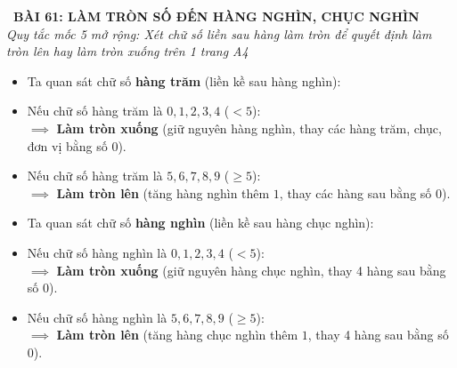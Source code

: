 \documentclass[11pt,a4paper]{article}
\begin{document}
\begin{tcolorbox}[
  enhanced,
  colback=white,
  colframe=primary,
  arc=3mm,
  boxrule=1.2pt,
  left=4mm, right=4mm, top=2.5mm, bottom=2.5mm,
  drop shadow=black!10!white
]
  \centering
  {\Large\bfseries\color{primary}\faBookmark\ BÀI 61: LÀM TRÒN SỐ ĐẾN HÀNG NGHÌN, CHỤC NGHÌN}\\[1.5mm]
  {\small\itshape\color{black!75}Quy tắc mốc 5 mở rộng: Xét chữ số liền sau hàng làm tròn để quyết định làm tròn lên hay làm tròn xuống trên 1 trang A4}
\end{tcolorbox}

\vspace{-2mm}


\noindent
\begin{minipage}[t]{0.49\textwidth}\vspace{0pt}
\begin{tcolorbox}[
  enhanced,
  colback=blue!4!white,
  colframe=blue!75!black,
  arc=2mm, boxrule=0.8pt,
  left=2mm, right=2mm, top=1.8mm, bottom=1.8mm,
  title={\footnotesize\bfseries\color{white}\faKey\ 1. Làm tròn đến hàng nghìn}
]
{\footnotesize
\begin{itemize}\setlength{\itemsep}{1.5pt}\setlength{\leftskip}{-2.5mm}
  \item Ta quan sát chữ số \textbf{hàng trăm} (liền kề sau hàng nghìn):
  \item Nếu chữ số hàng trăm là $0, 1, 2, 3, 4$ ($< 5$):\\
  $\implies$ \textbf{Làm tròn xuống} (giữ nguyên hàng nghìn, thay các hàng trăm, chục, đơn vị bằng số $0$).
  \item Nếu chữ số hàng trăm là $5, 6, 7, 8, 9$ ($\ge 5$):\\
  $\implies$ \textbf{Làm tròn lên} (tăng hàng nghìn thêm $1$, thay các hàng sau bằng số $0$).
\end{itemize}
}
\end{tcolorbox}
\end{minipage}
\hfill
\begin{minipage}[t]{0.49\textwidth}\vspace{0pt}
\begin{tcolorbox}[
  enhanced,
  colback=teal!4!white,
  colframe=teal!75!black,
  arc=2mm, boxrule=0.8pt,
  left=2mm, right=2mm, top=1.8mm, bottom=1.8mm,
  title={\footnotesize\bfseries\color{white}\faSliders\ 2. Làm tròn đến hàng chục nghìn}
]
{\footnotesize
\begin{itemize}\setlength{\itemsep}{1.5pt}\setlength{\leftskip}{-2.5mm}
  \item Ta quan sát chữ số \textbf{hàng nghìn} (liền kề sau hàng chục nghìn):
  \item Nếu chữ số hàng nghìn là $0, 1, 2, 3, 4$ ($< 5$):\\
  $\implies$ \textbf{Làm tròn xuống} (giữ nguyên hàng chục nghìn, thay 4 hàng sau bằng số $0$).
  \item Nếu chữ số hàng nghìn là $5, 6, 7, 8, 9$ ($\ge 5$):\\
  $\implies$ \textbf{Làm tròn lên} (tăng hàng chục nghìn thêm $1$, thay 4 hàng sau bằng số $0$).
\end{itemize}
}
\end{tcolorbox}
\end{minipage}
\end{document}
